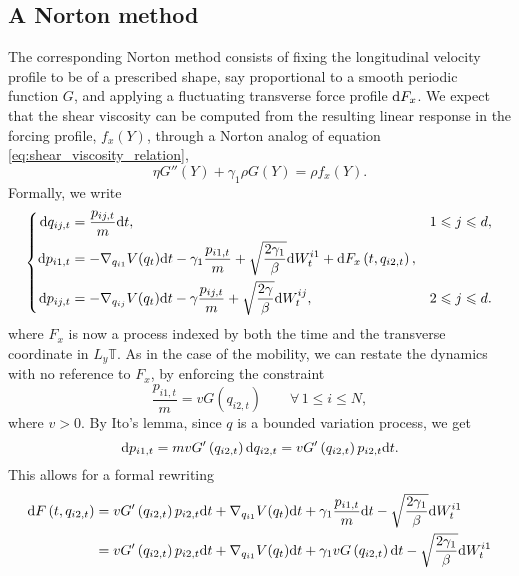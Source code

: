 \subsection{A Norton method}
The corresponding Norton method consists of fixing the longitudinal velocity profile to be of a prescribed shape, say proportional to a smooth periodic function $G$, and applying a 
fluctuating transverse force profile $\mathrm{d} F_x$. We expect that the shear viscosity can be computed from the resulting linear response in the forcing profile, $f_x(Y)$, through a Norton analog of equation \eqref{eq:shear_viscosity_relation},
\begin{equation}
    \label{eq:shear_viscosity_relation_norton}
    \eta G''(Y)+\gamma_1 \rho G(Y)=\rho f_x(Y).
\end{equation}
Formally, we write
\begin{equation}
    \left\{\begin{aligned}
        \mathrm{d} q_{ij,t}&=\frac{p_{ij,t}}m\mathrm{d} t,&1\leqslant j\leqslant d,\\
        \mathrm{d} p_{i1,t}&=-\nabla_{q_{i1}}V(q_t)\mathrm{d} t-\gamma_1\frac{p_{i1,t}}m+\sqrt{\frac{2\gamma_1}\beta}\mathrm{d} W_t^{i1}+\mathrm{d} F_x\left(t,q_{i2,t}\right),&\\
        \mathrm{d} p_{ij,t}&=-\nabla_{q_{ij}}V(q_t)\mathrm{d} t-\gamma \frac{p_{ij,t}}m+\sqrt{\frac{2\gamma}\beta}\mathrm{d} W_t^{ij},&2\leqslant j\leqslant d.
    \end{aligned}\right.
\end{equation}
where $F_x$ is now a process indexed by both the time and the transverse coordinate in $L_y \mathbb T$.
As in the case of the mobility, we can restate the dynamics with no reference to $F_x$, by enforcing the constraint
\begin{equation}
    \label{eq:norton_shear_viscosity_constraint}
    \frac{p_{i1,t}}m=vG\left(q_{i2,t}\right)\qquad \forall\, 1\leq i\leq N,
\end{equation}
where $v>0$.
By Ito's lemma, since $q$ is a bounded variation process, we get
\[\mathrm{d}{p_{i1,t}}=mvG'\left(q_{i2,t}\right)\mathrm{d} q_{i2,t}=vG'\left(q_{i2,t}\right)p_{i2,t}\mathrm{d} t.\]
This allows for a formal rewriting 
\begin{equation}\label{eq:norton_sv_multiplier}
    \begin{aligned}
        \mathrm{d} F\left(t,q_{i2,t}\right)&= vG'\left(q_{i2,t}\right)p_{i2,t}\mathrm{d} t+\nabla_{q_{i1}}V(q_t)\mathrm{d} t+\gamma_1\frac{p_{i1,t}}m\mathrm{d} t-\sqrt{\frac{2\gamma_1}\beta}\mathrm{d} W_t^{i1}\\
        &=vG'\left(q_{i2,t}\right)p_{i2,t}\mathrm{d} t+\nabla_{q_{i1}}V(q_t)\mathrm{d} t+\gamma_1vG\left(q_{i2,t}\right)\mathrm{d} t-\sqrt{\frac{2\gamma_1}\beta}\mathrm{d} W_t^{i1}
    \end{aligned}
\end{equation}
